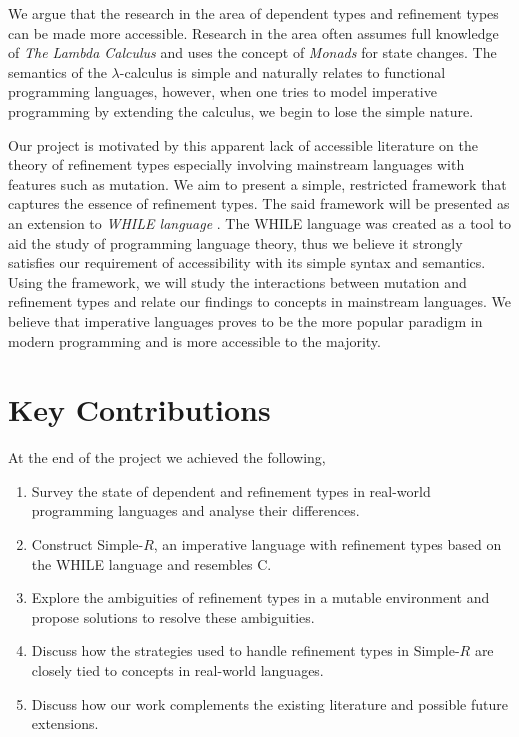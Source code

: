 \documentclass[a4paper,12pt]{report}
\begin{document}
\par
We argue that the research in the area of dependent types and refinement 
types can be made more accessible. Research in the area often assumes full 
knowledge of \textit{The Lambda Calculus} \cite{lambdaCalculus} and uses 
the concept of \textit{Monads} \cite{monads} for state changes. The semantics 
of the $\lambda$-calculus is simple and naturally 
relates to functional programming languages, however, when one tries to model 
imperative programming by extending the calculus, we begin to lose the simple 
nature. 

\par
Our project is motivated by this apparent lack of accessible literature on the 
theory of refinement types especially involving mainstream languages 
with features such as mutation. We aim to present a simple, restricted framework that 
captures the essence of refinement types. The said framework will be presented as 
an extension to \textit{WHILE language} \cite{whileLanguage}. The WHILE language was 
created as a tool to aid the study of programming language theory, 
thus we believe it strongly satisfies our requirement of accessibility with 
its simple syntax and semantics. Using the 
framework, we will study the interactions between mutation and refinement types 
and relate our findings to concepts in mainstream languages. We believe that 
imperative languages proves to be the more popular paradigm in modern 
programming and is more accessible to the majority. 


\section{Key Contributions}
At the end of the project we achieved the following, 
\begin{enumerate}
  \item Survey the state of dependent and refinement types in 
  real-world programming languages and analyse their differences.
  \item Construct Simple-$R$, an imperative language with refinement types 
  based on the WHILE language and resembles C. 
  \item Explore the ambiguities of refinement types in a mutable environment 
  and propose solutions to resolve these ambiguities.
  \item Discuss how the strategies used to handle refinement types in 
  Simple-$R$ are closely tied to concepts in real-world languages.  
  \item Discuss how our work complements the existing literature and possible 
  future extensions.
\end{enumerate}
\end{document}
